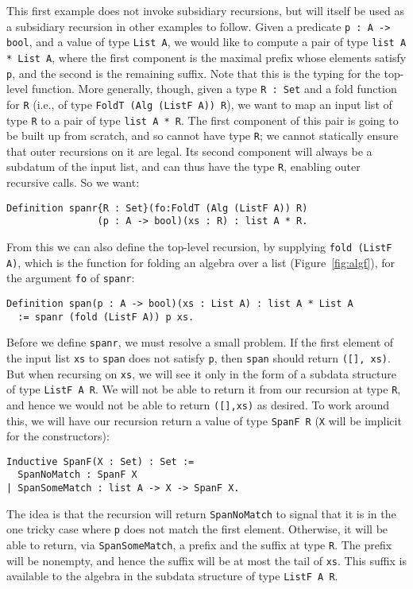 \documentclass[a4paper,USenglish]{lipics-v2021}
\begin{document}
This first example does not invoke subsidiary recursions, but will
itself be used as a subsidiary recursion in other examples to follow.
Given a predicate \verb|p : A -> bool|, and a value of type
\verb|List A|, we would like to compute a pair of type
\verb|list A * List A|, where the first component is the maximal
prefix whose elements satisfy \verb|p|, and the second is the
remaining suffix. Note that this is the typing for the top-level function.  More
generally, though, given a type \verb|R : Set| and a
fold function for \verb|R| (i.e., of type
\verb|FoldT (Alg (ListF A)) R|), we want to map an input list of
type \verb|R| to a pair of type \verb|list A * R|.  The first
component of this pair is going to be built up from scratch, and so
cannot have type \verb|R|; we cannot statically ensure that outer
recursions on it are legal.  Its second component will always be a
subdatum of the input list, and can thus have the type \verb|R|,
enabling outer recursive calls.  So we want:
\begin{verbatim}
Definition spanr{R : Set}(fo:FoldT (Alg (ListF A)) R)
                (p : A -> bool)(xs : R) : list A * R.
\end{verbatim}
\noindent From this we can also define the top-level recursion, by
supplying \verb|fold (ListF A)|, which is the function for folding an algebra
over a list (Figure~\ref{fig:algf}), for the argument \verb|fo| of \verb|spanr|:
\begin{verbatim}
Definition span(p : A -> bool)(xs : List A) : list A * List A
  := spanr (fold (ListF A)) p xs.
\end{verbatim}

Before we define \verb|spanr|, we must resolve a small problem.
If the first element of the input list
\verb|xs| to \verb|span| does not satisfy \verb|p|, then \verb|span|
should return \verb|([], xs)|.  But when recursing on \verb|xs|, we
will see it only in the form of a subdata structure of type
\verb|ListF A R|.  We will not be able to return it from our recursion at
type \verb|R|, and hence we would not be able to return \verb|([],xs)|
as desired.  To work around this, we will have our recursion return a value
of type \verb|SpanF R| (\verb|X| will be implicit for the constructors):
\begin{verbatim}
Inductive SpanF(X : Set) : Set :=
  SpanNoMatch : SpanF X
| SpanSomeMatch : list A -> X -> SpanF X.
\end{verbatim}
\noindent The idea is that the recursion will return
\verb|SpanNoMatch| to signal that it is in the one tricky case where
\verb|p| does not match the first element.  Otherwise, it will be able
to return, via \verb|SpanSomeMatch|, a prefix and the suffix at type
\verb|R|. The prefix will be nonempty, and hence the suffix will be at
most the tail of \verb|xs|.  This suffix is available to the algebra
in the subdata structure of type \verb|ListF A R|.
\end{document}
